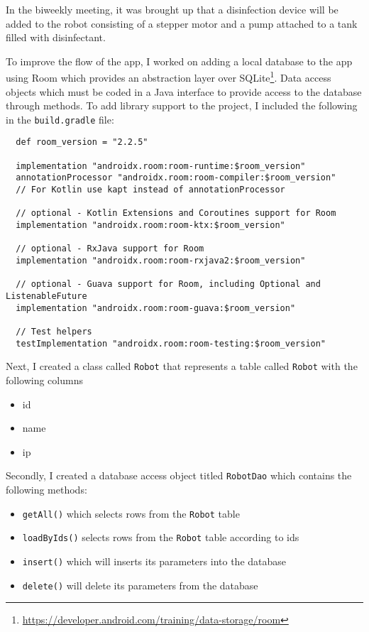 \documentclass[fontsize=11pt, %
                             paper=a4, %
                             twoside, %
                             captions=tableheading,
                             index=totoc,
                             hyperref]{labbook}
\begin{document}
\begin{addmargin}[0cm]{0cm}
In the biweekly meeting, it was brought up that a disinfection device will be added to the robot consisting of a stepper motor and a pump attached to a tank filled with disinfectant.

To improve the flow of the app, I worked on adding a local database to the app using Room which provides an abstraction layer over SQLite\footnote{\url{https://developer.android.com/training/data-storage/room}}. Data access objects which must be coded in a Java interface to provide access to the database through methods. To add library support to the project, I included the following in the \texttt{build.gradle} file:
\begin{Verbatim}
  def room_version = "2.2.5"

  implementation "androidx.room:room-runtime:$room_version"
  annotationProcessor "androidx.room:room-compiler:$room_version" 
  // For Kotlin use kapt instead of annotationProcessor

  // optional - Kotlin Extensions and Coroutines support for Room
  implementation "androidx.room:room-ktx:$room_version"

  // optional - RxJava support for Room
  implementation "androidx.room:room-rxjava2:$room_version"

  // optional - Guava support for Room, including Optional and ListenableFuture
  implementation "androidx.room:room-guava:$room_version"

  // Test helpers
  testImplementation "androidx.room:room-testing:$room_version"
\end{Verbatim}
Next, I created a class called \texttt{Robot} that represents a table called \texttt{Robot} with the following columns
\begin{itemize}
\item id
\item name
\item ip
\end{itemize}
Secondly, I created a database access object titled \texttt{RobotDao} which contains the following methods:
\begin{itemize}
\item \texttt{getAll()} which selects rows from the \texttt{Robot} table
\item \texttt{loadByIds()} selects rows from the \texttt{Robot} table according to ids
\item \texttt{insert()} which will inserts its parameters into the database
\item \texttt{delete()} will delete its parameters from the database
\end{itemize}


\end{addmargin}
\end{document}
